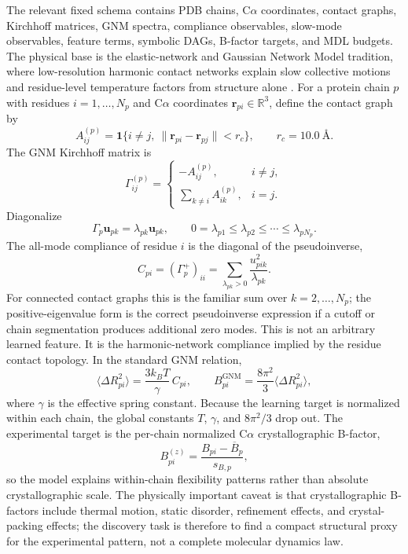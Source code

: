 \documentclass[11pt]{article}
\theoremstyle{definition}
\begin{document}
The relevant fixed schema contains PDB chains, C$\alpha$ coordinates, contact graphs, Kirchhoff matrices, GNM spectra, compliance observables, slow-mode observables, feature terms, symbolic DAGs, B-factor targets, and MDL budgets. The physical base is the elastic-network and Gaussian Network Model tradition, where low-resolution harmonic contact networks explain slow collective motions and residue-level temperature factors from structure alone \citep{tirion_elastic_1996,bahar_gnm_1997,haliloglu_gaussian_1997}. For a protein chain $p$ with residues $i=1,\ldots,N_p$ and C$\alpha$ coordinates $\mathbf r_{pi}\in\mathbb R^3$, define the contact graph by
\[
A^{(p)}_{ij}
=\mathbf 1\{i\neq j,\ \|\mathbf r_{pi}-\mathbf r_{pj}\|<r_c\},
\qquad r_c=10.0~\text{\AA}.
\]
The GNM Kirchhoff matrix is
\[
\Gamma^{(p)}_{ij}=
\begin{cases}
-A^{(p)}_{ij}, & i\neq j,\\
\sum_{k\neq i} A^{(p)}_{ik}, & i=j .
\end{cases}
\]
Diagonalize
\[
\Gamma_p\mathbf u_{pk}=\lambda_{pk}\mathbf u_{pk},
\qquad
0=\lambda_{p1}\leq\lambda_{p2}\leq\cdots\leq\lambda_{pN_p}.
\]
The all-mode compliance of residue $i$ is the diagonal of the pseudoinverse,
\[
C_{pi}
=(\Gamma_p^+)_{ii}
=\sum_{\lambda_{pk}>0}\frac{u_{pik}^2}{\lambda_{pk}}.
\]
For connected contact graphs this is the familiar sum over $k=2,\ldots,N_p$; the positive-eigenvalue form is the correct pseudoinverse expression if a cutoff or chain segmentation produces additional zero modes.
This is not an arbitrary learned feature. It is the harmonic-network compliance implied by the residue contact topology. In the standard GNM relation,
\[
\langle \Delta R_{pi}^2\rangle
=\frac{3k_B T}{\gamma}\,C_{pi},
\qquad
B_{pi}^{\mathrm{GNM}}
=\frac{8\pi^2}{3}\langle \Delta R_{pi}^2\rangle,
\]
where $\gamma$ is the effective spring constant. Because the learning target is normalized within each chain, the global constants $T$, $\gamma$, and $8\pi^2/3$ drop out. The experimental target is the per-chain normalized C$\alpha$ crystallographic B-factor,
\[
B^{(z)}_{pi}=\frac{B_{pi}-\overline{B}_p}{s_{B,p}},
\]
so the model explains within-chain flexibility patterns rather than absolute crystallographic scale. The physically important caveat is that crystallographic B-factors include thermal motion, static disorder, refinement effects, and crystal-packing effects; the discovery task is therefore to find a compact structural proxy for the experimental pattern, not a complete molecular dynamics law.
\end{document}

